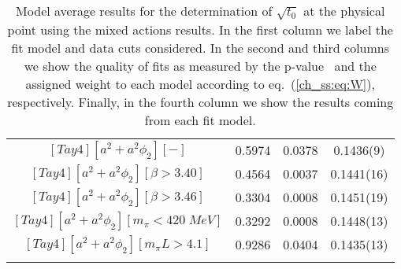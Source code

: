 \begin{longtable}{ c | c | c | c }
$[Tay4][a^2+a^2\phi_2][-]$ & 0.5974 & 0.0378 & 0.1436(9) \\
$[Tay4][a^2+a^2\phi_2][\beta>3.40]$ & 0.4564 & 0.0037 & 0.1441(16) \\
$[Tay4][a^2+a^2\phi_2][\beta>3.46]$ & 0.3304 & 0.0008 & 0.1451(19) \\
$[Tay4][a^2+a^2\phi_2][m_{\pi}<420\;MeV]$ & 0.3292 & 0.0008 & 0.1448(13) \\
$[Tay4][a^2+a^2\phi_2][m_{\pi}L>4.1]$ & 0.9286 & 0.0404 & 0.1435(13) \\
\bottomrule
\caption{Model average results for the determination of $\sqrt{t_0}$ at the physical point using the mixed actions results. In the first column we label the fit model and data cuts considered. In the second and third columns we show the quality of fits as measured by the p-value~\citep{Bruno:2022mfy} and the assigned weight to each model according to eq.~(\ref{ch_ss:eq:W}), respectively. Finally, in the fourth column we show the results coming from each fit model.}
\end{longtable}

